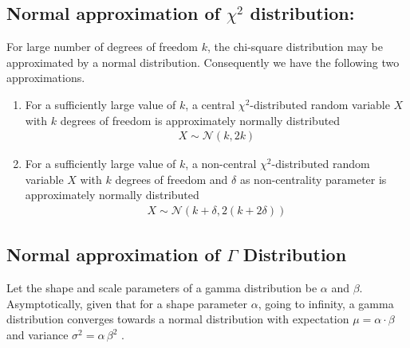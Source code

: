 
\subsection{Normal approximation of $\chi^2$ distribution:} \label{section:normal_approximation_of_chi_square_distribution}
\citep{chi_square_normal_approximation} For large number of degrees of freedom $k$, the chi-square distribution may be approximated by a normal distribution. Consequently we have the following two approximations.
\begin{enumerate}
\item For a sufficiently large value of $k$, a central $\chi^2$-distributed random variable $X$ with $k$ degrees of freedom is approximately normally distributed
\begin{eqnarray}
X \sim \mathcal{N}\left(k,2k \right) \label{eqn:chi_square_central_normal_approx}
\end{eqnarray}
\item For a sufficiently large value of $k$, a non-central $\chi^2$-distributed random variable $X$ with $k$ degrees of freedom and $\delta$ as non-centrality parameter is approximately normally distributed
\begin{eqnarray}
X \sim \mathcal{N}\left(k+\delta,2 \left(k+ 2\delta \right) \right) \label{eqn:chi_square_non_central_normal_approx}
\end{eqnarray}
\end{enumerate}


\subsection{Normal approximation of $\Gamma$ Distribution} \label{section:link_gamma_normal_distribution}
Let the shape and scale parameters of a gamma distribution be $\alpha$ and $\beta$. Asymptotically, given that for a shape parameter $\alpha$,  going to infinity, a gamma distribution converges towards a normal distribution with expectation  $\mu = \alpha\cdot \beta$ and variance  $\sigma^2 = \alpha\, \beta^2$ \cite{normal_approximation_of_gamma_distribution_uah}.

